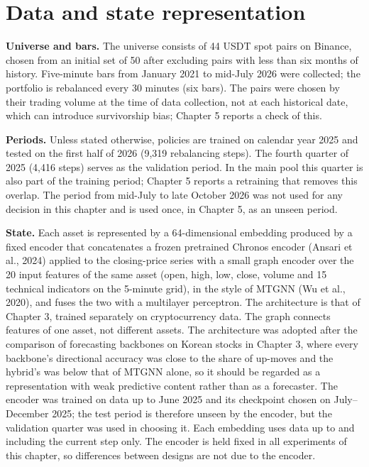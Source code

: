 \documentclass[12pt,a4paper]{report}
\begin{document}
\section{Data and state
representation}\label{data-and-state-representation}

\textbf{Universe and bars.} The universe consists of 44 USDT spot pairs
on Binance, chosen from an initial set of 50 after excluding pairs with
less than six months of history. Five-minute bars from January 2021 to
mid-July 2026 were collected; the portfolio is rebalanced every 30
minutes (six bars). The pairs were chosen by their trading volume at the
time of data collection, not at each historical date, which can
introduce survivorship bias; Chapter 5 reports a check of this.

\textbf{Periods.} Unless stated otherwise, policies are trained on
calendar year 2025 and tested on the first half of 2026 (9,319
rebalancing steps). The fourth quarter of 2025 (4,416 steps) serves as
the validation period. In the main pool this quarter is also part of the
training period; Chapter 5 reports a retraining that removes this
overlap. The period from mid-July to late October 2026 was not used for
any decision in this chapter and is used once, in Chapter 5, as an
unseen period.

\textbf{State.} Each asset is represented by a 64-dimensional embedding
produced by a fixed encoder that concatenates a frozen pretrained
Chronos encoder (Ansari et al., 2024) applied to the closing-price
series with a small graph encoder over the 20 input features of the same
asset (open, high, low, close, volume and 15 technical indicators on the
5-minute grid), in the style of MTGNN (Wu et al., 2020), and fuses the
two with a multilayer perceptron. The architecture is that of Chapter 3,
trained separately on cryptocurrency data. The graph connects features
of one asset, not different assets. The architecture was adopted after
the comparison of forecasting backbones on Korean stocks in Chapter 3,
where every backbone's directional accuracy was close to the share of
up-moves and the hybrid's was below that of MTGNN alone, so it should be
regarded as a representation with weak predictive content rather than as
a forecaster. The encoder was trained on data up to June 2025 and its
checkpoint chosen on July--December 2025; the test period is therefore
unseen by the encoder, but the validation quarter was used in choosing
it. Each embedding uses data up to and including the current step only.
The encoder is held fixed in all experiments of this chapter, so
differences between designs are not due to the encoder.
\end{document}
